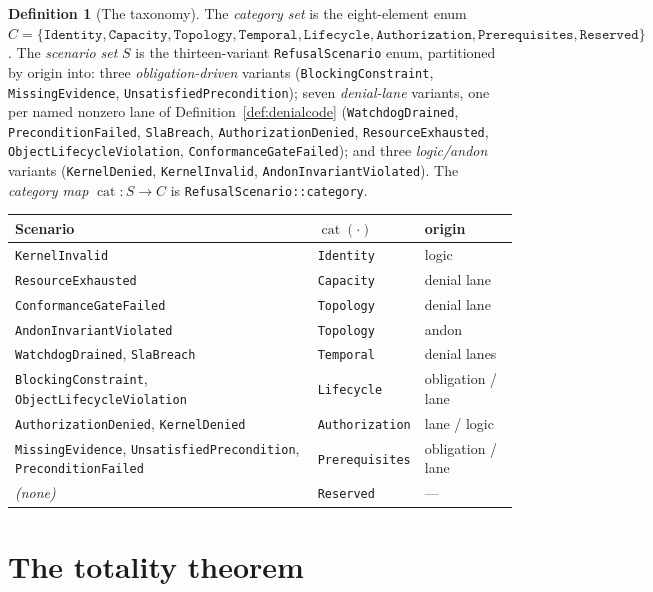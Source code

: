 \documentclass[11pt,oneside]{book}
\theoremstyle{definition}
\newtheorem{definition}{Definition}[chapter]
\theoremstyle{plain}
\theoremstyle{remark}
\newcommand{\code}[1]{\texttt{#1}}
\newcommand{\Catset}{C}              %
\newcommand{\Scnset}{S}              %
\DeclareMathOperator{\catop}{cat}
\begin{document}
\begin{definition}[The taxonomy]\label{def:tax}
The \emph{category set} is the eight-element enum $\Catset=\{\code{Identity},\code{Capacity},\code{Topology},\code{Temporal}, \code{Lifecycle},\code{Authorization},\code{Prerequisites},\code{Reserved}\}$. %
The \emph{scenario set} $\Scnset$ is the thirteen-variant \code{RefusalScenario} enum, partitioned by origin into: three \emph{obligation-driven} variants (\code{BlockingConstraint}, \code{MissingEvidence}, \code{UnsatisfiedPrecondition}); seven \emph{denial-lane} variants, one per named nonzero lane of Definition~\ref{def:denialcode} (\code{WatchdogDrained}, \code{PreconditionFailed}, \code{SlaBreach}, \code{AuthorizationDenied}, \code{ResourceExhausted}, \code{ObjectLifecycleViolation}, \code{ConformanceGateFailed}); and three \emph{logic/andon} variants (\code{KernelDenied}, \code{KernelInvalid}, \code{AndonInvariantViolated}). %
The \emph{category map} $\catop:\Scnset\to\Catset$ is \code{RefusalScenario::category}. %
\end{definition}

\begin{center}
\small
\begin{tabular}{lll}
\toprule
Scenario & $\catop(\cdot)$ & origin\\
\midrule
\code{KernelInvalid} & \code{Identity} & logic\\
\code{ResourceExhausted} & \code{Capacity} & denial lane\\
\code{ConformanceGateFailed} & \code{Topology} & denial lane\\
\code{AndonInvariantViolated} & \code{Topology} & andon\\
\code{WatchdogDrained}, \code{SlaBreach} & \code{Temporal} & denial lanes\\
\code{BlockingConstraint}, \code{ObjectLifecycleViolation} & \code{Lifecycle} & obligation / lane\\
\code{AuthorizationDenied}, \code{KernelDenied} & \code{Authorization} & lane / logic\\
\code{MissingEvidence}, \code{UnsatisfiedPrecondition}, \code{PreconditionFailed} & \code{Prerequisites} & obligation / lane\\
\midrule
\emph{(none)} & \code{Reserved} & ---\\
\bottomrule
\end{tabular}
\end{center}

\section{The totality theorem}
\end{document}
